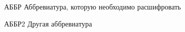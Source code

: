 \Abbreviations

\begin{AbbreviationsList}
\item[АББР] Аббревиатура, которую необходимо расшифровать
\item[АББР2] Другая аббревиатура
\end{AbbreviationsList}